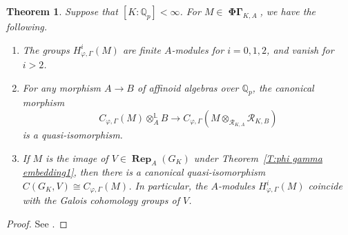 \documentclass[12pt]{amsart}
\newtheorem{theorem}{Theorem}[section]
\theoremstyle{definition}
\numberwithin{equation}{theorem}
\newcommand{\QQ}{\mathbb{Q}}
\newcommand{\calR}{\mathcal{R}}
\DeclareMathOperator{\PhiGamma}{\mathbf{\Phi \Gamma}}
\DeclareMathOperator{\Rep}{\mathbf{Rep}}
\begin{document}
\begin{theorem} \label{T:coherence cohomology}
Suppose that $[K:\QQ_p] < \infty$.
For $M \in \PhiGamma_{K,A}$, we have the following.
\begin{enumerate}
\item[(a)] The groups $H^i_{\varphi, \Gamma}(M)$ are finite $A$-modules for $i=0,1,2$, and vanish for $i>2$.
\item[(b)] For any morphism $A \to B$ of affinoid algebras over $\QQ_p$, the canonical morphism
\[
C_{\varphi, \Gamma}(M) \otimes^{\mathbb{L}}_A B
\to C_{\varphi, \Gamma}(M \otimes_{\calR_{K,A}} \calR_{K,B})
\]
is a quasi-isomorphism.
\item[(c)]
If $M$ is the image of $V \in \Rep_A(G_K)$ under Theorem~\ref{T:phi gamma embedding1},
then there is a canonical quasi-isomorphism $C(G_K, V) \cong C_{\varphi, \Gamma}(M)$.
In particular, the $A$-modules $H^i_{\varphi, \Gamma}(M)$ coincide with the Galois cohomology groups of $V$.
\end{enumerate}
\end{theorem}
\begin{proof}
See \cite[Proposition~2.3.7, Theorem~4.4.2, Theorem~4.4.3]{kpx}.
\end{proof}
\end{document}
